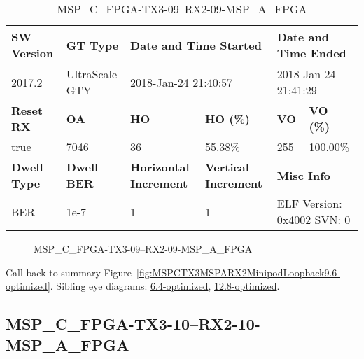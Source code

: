 \begin{table}[h]
\centering
\caption{MSP\_C\_FPGA-TX3-09--RX2-09-MSP\_A\_FPGA}
\label{tab:MSPCFPGATX309RX209MSPAFPGA9.6-optimized}
\begin{tabular}{@{}|l|l|l|l|l|l|@{}}
\toprule
\textbf{SW Version}                & \textbf{GT Type}   & \multicolumn{2}{l|}{\textbf{Date and Time Started}}            & \multicolumn{2}{l|}{\textbf{Date and Time Ended}}        \\ \midrule
2017.2                       & UltraScale GTY          & \multicolumn{2}{l|}{2018-Jan-24 21:40:57}                   & \multicolumn{2}{l|}{2018-Jan-24 21:41:29}               \\ \midrule
\textbf{Reset RX}                  & \textbf{OA} & \textbf{HO}   & \textbf{HO (\%)} & \textbf{VO} & \textbf{VO (\%)} \\ \midrule
true & 7046        & 36          & 55.38\%        & 255        & 100.00\%       \\ \midrule
\textbf{Dwell Type}                & \textbf{Dwell BER} & \textbf{Horizontal Increment} & \textbf{Vertical Increment}    & \multicolumn{2}{l|}{\textbf{Misc Info}}                  \\ \midrule
BER                            & 1e-7        & 1        & 1           & \multicolumn{2}{l|}{ELF Version: 0x4002 SVN: 0}                         \\ \bottomrule
\end{tabular}
\end{table}

\begin{figure}[h]
\caption{MSP\_C\_FPGA-TX3-09--RX2-09-MSP\_A\_FPGA} \label{fig:MSPCFPGATX309RX209MSPAFPGA9.6-optimized}
\end{figure}

Call back to summary Figure~\ref{fig:MSPCTX3MSPARX2MinipodLoopback9.6-optimized}.
Sibling eye diagrams: \hyperref[sec:MSPCFPGATX309RX209MSPAFPGA6.4-optimized]{6.4-optimized}, \hyperref[sec:MSPCFPGATX309RX209MSPAFPGA12.8-optimized]{12.8-optimized}.

\clearpage
\newpage


\subsection{MSP\_C\_FPGA-TX3-10--RX2-10-MSP\_A\_FPGA}\label{sec:MSPCFPGATX310RX210MSPAFPGA9.6-optimized}

